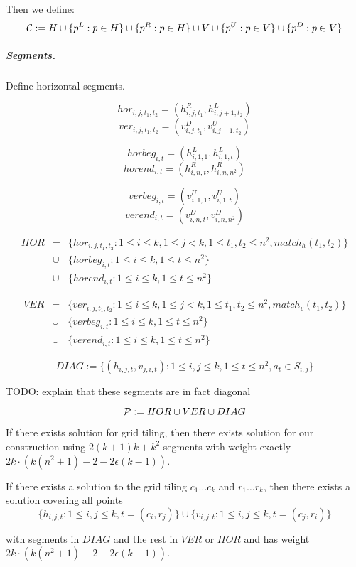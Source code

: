 Then we define:
$$\mathcal{C} := H \cup \{p^L : p \in H\} \cup \{p^R : p \in H\}
\cup V \cup \{p^U : p \in V\} \cup \{p^D : p \in V\} $$


\subparagraph{Segments.}
Define horizontal segments.

$$hor_{i, j, t_1, t_2} = (h^R_{i,j,t_1}, h^L_{i, j+1, t_2})$$
$$ver_{i, j, t_1, t_2} = (v^D_{i,j,t_1}, v^U_{i, j+1, t_2})$$

$$horbeg_{i, t} = (h^L_{i, 1, 1}, h^L_{i, 1, t})$$
$$horend_{i, t} = (h^R_{i, n, t}, h^R_{i, n, n^2})$$


$$verbeg_{i, t} = (v^U_{i, 1, 1}, v^U_{i, 1, t})$$
$$verend_{i, t} = (v^D_{i, n, t}, v^D_{i, n, n^2})$$

\begin{eqnarray*}
HOR &= &\{hor_{i, j, t_1, t_2} : 1 \le i \le k, 1 \le j < k,
1 \le t_1, t_2 \le n^2, match_h(t_1, t_2)\} \\
&\cup &\{horbeg_{i,t} : 1 \le i \le k, 1 \le t \le n^2\}
\\
&\cup &\{horend_{i,t} : 1 \le i \le k, 1 \le t \le n^2\}
\end{eqnarray*}

\begin{eqnarray*}
VER &= &\{ver_{i, j, t_1, t_2} : 1 \le i \le k, 1 \le j < k,
1 \le t_1, t_2 \le n^2, match_v(t_1, t_2)\} \\
&\cup &\{verbeg_{i,t} : 1 \le i \le k, 1 \le t \le n^2\}
\\
&\cup &\{verend_{i,t} : 1 \le i \le k, 1 \le t \le n^2\}
\end{eqnarray*}

$$DIAG := \{ (h_{i, j, t}, v_{j, i, t}) :
	1 \le i, j \le k, 1 \le t \le n^2, a_t \in S_{i, j}\}$$

TODO: explain that these segments are in fact diagonal

$$\mathcal{P} := HOR \cup VER \cup DIAG$$



\begin{lemma}
	If there exists solution for grid tiling,
	then there exists solution for our construction
	using $2(k+1)k + k^2$ segments
	with weight exactly $2k \cdot (k(n^2+1) - 2 - 2\epsilon(k-1))$.
\end{lemma}

\begin{claim}
	If there exists a solution to the grid tiling
	$c_1 \ldots c_k$ and $r_1 \ldots r_k$,
	then there exists a solution covering
	all points
	$$\{h_{i, j, t} : 1 \le i, j \le k, t=(c_i, r_j)\}
	\cup \{v_{i, j, t} : 1 \le i, j \le k, t=(c_j, r_i)\}$$
	
	with segments in $DIAG$
	and the rest in $VER$ or $HOR$
	and has weight $2k \cdot (k(n^2+1) - 2 - 2\epsilon(k-1))$.
\end{claim}

